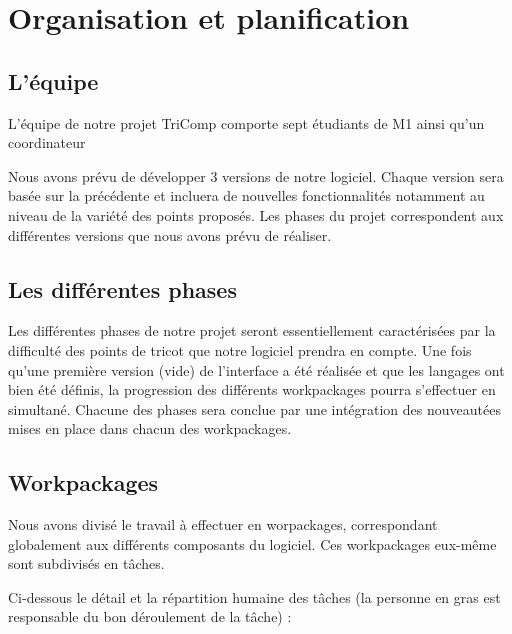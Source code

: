 \documentclass{article}
\begin{document}
\section{Organisation et planification}

\subsection{L'équipe}

L'équipe de notre projet TriComp comporte sept étudiants de M1 ainsi qu'un coordinateur

Nous avons prévu de développer 3 versions de notre logiciel. Chaque version sera basée sur la précédente et incluera de nouvelles fonctionnalités notamment au niveau de la variété des points proposés.
Les phases du projet correspondent aux différentes versions que nous avons prévu de réaliser.



\subsection{Les différentes phases}

Les différentes phases de notre projet seront essentiellement caractérisées par la difficulté des points de tricot que notre logiciel
prendra en compte.
Une fois qu'une première version (vide) de l'interface a été réalisée et que les langages ont bien été définis, la progression des
différents workpackages pourra s'effectuer en simultané. Chacune des phases sera conclue par une intégration des nouveautées mises en
place dans chacun des workpackages.


\subsection{Workpackages}

Nous avons divisé le travail à effectuer en worpackages, correspondant globalement aux différents composants du logiciel. Ces workpackages eux-même sont subdivisés en tâches.

Ci-dessous le détail et la répartition humaine des tâches (la personne en gras est responsable du bon déroulement de la tâche) :
\end{document}
